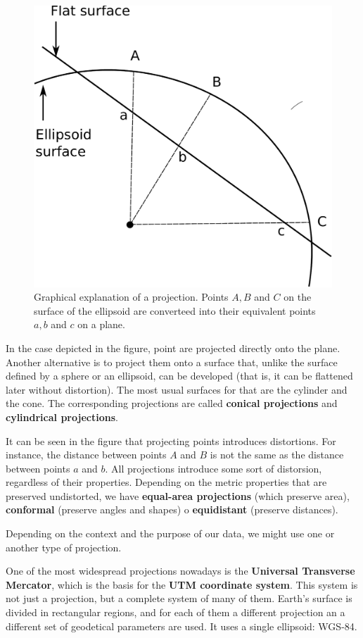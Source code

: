 \begin{figure}
\centering
\includegraphics[width=.5\columnwidth]{Cartography/Projection.pdf}
\caption{\small Graphical explanation of a projection. Points $A, B$ and $C$ on the surface of the ellipsoid are converteed into their equivalent points $a, b$ and $c$ on a plane.}
\label{Fig:Projection} 
\end{figure}

In the case depicted in the figure, point are projected directly onto the plane. Another alternative is to project them onto a surface that, unlike the surface defined by a sphere or an ellipsoid, can be developed (that is, it can be flattened later without distortion). The most usual surfaces for that are the cylinder and the cone. The corresponding projections are called \textbf{conical projections} and \textbf{cylindrical projections}.

It can be seen in the figure that projecting points introduces distortions. For instance, the distance between points $A$ and $B$ is not the same as the distance between points $a$ and $b$. All projections introduce some sort of distorsion, regardless of their properties. Depending on the metric properties that are preserved undistorted, we have \textbf{equal-area projections} (which preserve area), \textbf{conformal} (preserve angles and shapes) o \textbf{equidistant} (preserve distances).

Depending on the context and the purpose of our data, we might use one or another type of projection. 

One of the most widespread projections nowadays is the \textbf{Universal Transverse Mercator}, which is the basis for the \textbf{UTM coordinate system}. This system is not just a projection, but a complete system of many of them. Earth's surface is divided in rectangular regions, and for each of them a different projection an a different set of geodetical parameters are used. It uses a single ellipsoid: WGS-84.

